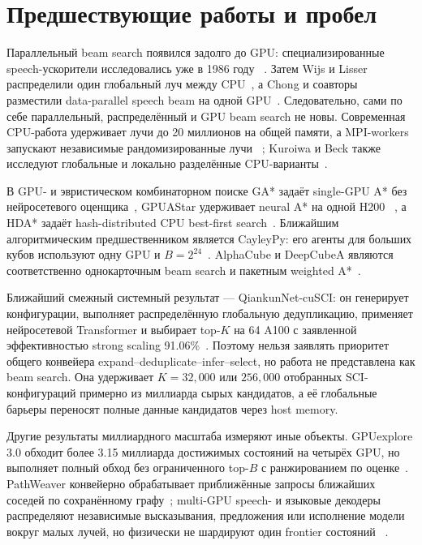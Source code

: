 \documentclass[10pt,twocolumn]{article}
\begin{document}
\section{Предшествующие работы и пробел}
Параллельный beam search появился задолго до GPU: специализированные
speech-ускорители исследовались уже в 1986 году
~\cite{anantharaman1986accelerator}. Затем Wijs и Lisser распределили один
глобальный луч между CPU~\cite{wijs2007distributed}, а Chong и соавторы
разместили data-parallel speech beam на одной GPU~\cite{chong2008lvcsr}.
Следовательно, сами по себе параллельный, распределённый и GPU beam search не
новы. Современная CPU-работа удерживает лучи до 20 миллионов на общей памяти, а
MPI-workers запускают независимые рандомизированные лучи
~\cite{frohner2022parallel}; Kuroiwa и Beck также исследуют глобальные и
локально разделённые CPU-варианты~\cite{kuroiwa2024parallel}.

В GPU- и эвристическом комбинаторном поиске GA* задаёт single-GPU A* без нейросетевого
оценщика~\cite{zhou2015gpuastar}, GPUAStar удерживает neural A* на одной H200
~\cite{soltani2026gpuastar}, а HDA* задаёт hash-distributed CPU best-first
search~\cite{kishimoto2013hda}. Ближайшим алгоритмическим предшественником
является CayleyPy: его агенты для больших кубов используют одну GPU и
$B=2^{24}$~\cite{chervov2025large,soibelman2025cayleypy}. AlphaCube и
DeepCubeA являются соответственно однокарточным beam search и пакетным
weighted A*~\cite{takano2023alphacube,agostinelli2019deepcubea}.

Ближайший смежный системный результат --- QiankunNet-cuSCI: он генерирует
конфигурации, выполняет распределённую глобальную дедупликацию, применяет
нейросетевой Transformer и выбирает top-$K$ на 64 A100 с заявленной
эффективностью strong scaling 91.06\%~\cite{sun2026cunnqssci}. Поэтому нельзя
заявлять приоритет общего конвейера expand--deduplicate--infer--select, но работа
не представлена как beam search. Она удерживает $K=32{,}000$ или $256{,}000$
отобранных SCI-конфигураций примерно из миллиарда сырых кандидатов, а её
глобальные барьеры переносят полные данные кандидатов через host memory.

Другие результаты миллиардного масштаба измеряют иные объекты. GPUexplore 3.0
обходит более 3.15 миллиарда достижимых состояний на четырёх GPU, но выполняет
полный обход без ограниченного top-$B$ с ранжированием по оценке~\cite{wijs2024gpuexplore}. PathWeaver
конвейерно обрабатывает приближённые запросы ближайших соседей по сохранённому
графу~\cite{kim2025pathweaver}; multi-GPU speech- и языковые декодеры
распределяют независимые высказывания, предложения или исполнение модели вокруг
малых лучей, но физически не шардируют один frontier состояний
~\cite{junczysdowmunt2016marian,braun2020gpuasr,chan2025trie}.
\end{document}
